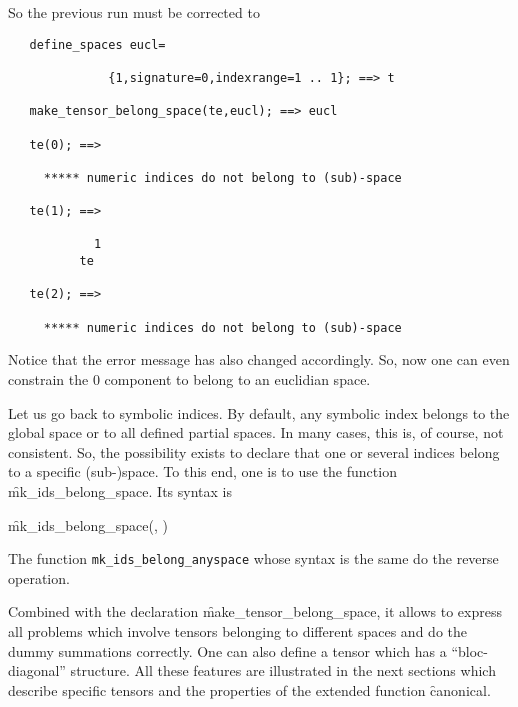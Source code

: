 So the previous run must be corrected to
\begin{verbatim}
   define_spaces eucl=

              {1,signature=0,indexrange=1 .. 1}; ==> t

   make_tensor_belong_space(te,eucl); ==> eucl

   te(0); ==>

     ***** numeric indices do not belong to (sub)-space

   te(1); ==>

            1
          te

   te(2); ==>

     ***** numeric indices do not belong to (sub)-space
\end{verbatim} 
Notice that the error message has also changed accordingly.
So, now one can even constrain the 0 component to belong to
an euclidian space.

\hypertarget{operator:MK_IDS_BELONG_SPACE}{}
\hypertarget{operator:MK_IDS_BELONG_ANYSPACE}{}
Let us go back to symbolic indices.
By default, any symbolic index belongs to the global space or to all
defined partial spaces. In many cases, this is, of course, not consistent.
So, the possibility exists to declare that one or several indices
belong to a specific (sub-)space. To this end, one is to use the
function \f{mk\_ids\_belong\_space}.
Its syntax is
\begin{syntax}
      \f{mk\_ids\_belong\_space}(,
                                )
\end{syntax}
The function \texttt{mk\_ids\_belong\_anyspace}
whose syntax is the same do the reverse operation.

Combined with the declaration %
\f{make\_tensor\_belong\_space}, it allows to express all problems
which involve  tensors belonging to different spaces and do the dummy
summations correctly.
One can also define a tensor which has a 
 ``bloc-diagonal'' structure.
All these features are illustrated in the next sections which describe specific
tensors and the properties of the extended function
\f{canonical}.

